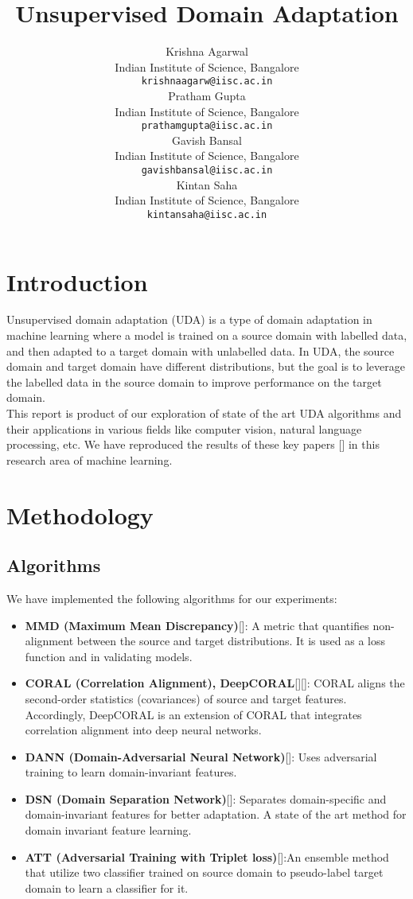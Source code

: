 \documentclass{article}
\title{Unsupervised Domain Adaptation}
\author{ Krishna Agarwal\\%
  Indian Institute of Science, Bangalore\\
  \texttt{krishnaagarw@iisc.ac.in} \\
   \And
  {Pratham Gupta} \\
  Indian Institute of Science, Bangalore\\
  \texttt{prathamgupta@iisc.ac.in} \\
   \And
   {Gavish Bansal} \\
   Indian Institute of Science, Bangalore\\
   \texttt{gavishbansal@iisc.ac.in} \\
   \And
   {Kintan Saha} \\
   Indian Institute of Science, Bangalore\\
   \texttt{kintansaha@iisc.ac.in} \\
}
\begin{document}
\maketitle


\begin{abstract}
  
\end{abstract}


\section{Introduction}
Unsupervised domain adaptation (UDA) is a type of domain adaptation in machine learning where a model is trained on a source domain with labelled data, and then adapted to a target domain with unlabelled data.
In UDA, the source domain and target domain have different distributions, but
the goal is to leverage the labelled data in the source domain to improve performance on the target
domain. \\
This report is product of our exploration of state of the art UDA algorithms and their applications in various fields like computer vision, natural language processing, etc. 
We have reproduced the results of these key papers [] in this research area of machine learning.

\section{Methodology}

\subsection{Algorithms}
We have implemented the following algorithms for our experiments:
\begin{itemize}
  \item \textbf{MMD (Maximum Mean Discrepancy)}[]: A metric that quantifies non-alignment between the source and target distributions. It is used as a loss function and in validating models. 
  \item \textbf{CORAL (Correlation Alignment), DeepCORAL}[][]: CORAL aligns the second-order statistics (covariances) of source and target features. Accordingly, DeepCORAL is an extension of CORAL that integrates correlation alignment into deep neural networks.
  \item \textbf{DANN (Domain-Adversarial Neural Network)}[]: Uses adversarial training to learn domain-invariant features. 
  \item \textbf{DSN (Domain Separation Network)}[]: Separates domain-specific and domain-invariant features for better adaptation. A state of the art method for domain invariant feature learning.
  \item \textbf{ATT (Adversarial Training with Triplet loss)}[]:An ensemble method that utilize two classifier trained on source domain to pseudo-label target domain to learn a classifier for it.
\end{itemize}
\end{document}
